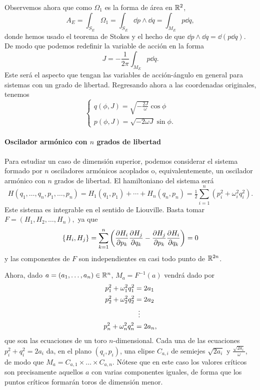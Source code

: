   Observemos ahora que como $\Omega_1$ es la forma de área en $\mathbb{R}^2$, 
  \begin{equation*}
    A_E=\int_{S_E}\Omega_1 = \int_{S_E} \dd p \wedge \dd q = \int_{M_E}p\dd q,
\end{equation*}
donde hemos usado el teorema de Stokes y el hecho de que $\dd p \wedge \dd q= \dd(p\dd q)$. De modo que podemos redefinir la variable de acción en la forma
\begin{equation*}
  J=-\frac{1}{2\pi}\int_{M_E}p \dd q.
\end{equation*}
Este será el aspecto que tengan las variables de acción-ángulo en general para sistemas con un grado de libertad. Regresando ahora a las coordenadas originales, tenemos
\begin{equation*}
  \begin{cases}
    q(\phi,J)=\sqrt{-\frac{2J}{ \omega}}\cos \phi\\
    p(\phi,J)=\sqrt{-2\omega J}\sin \phi.
  \end{cases}
\end{equation*}

\paragraph{\bf Oscilador armónico con $n$ grados de libertad}\mbox{}

  Para estudiar un caso de dimensión superior, podemos considerar el sistema formado por $n$ osciladores armónicos acoplados o, equivalentemente, un oscilador armónico con $n$ grados de libertad. El hamiltoniano del sistema será 
  \begin{equation*}
    H(q_1,\dots,q_n,p_1,\dots,p_n)= H_1(q_1,p_1)+ \cdots +H_n(q_n,p_n) = \tfrac{1}{2}\sum_{i=1}^n (p_i^2+\omega_i^2q_i^2).
  \end{equation*}
  Este sistema es integrable en el sentido de Liouville. Basta tomar $F=(H_1,H_2,\dots,H_n),$ ya que 
  \begin{equation*}
    \left\lbrace H_i,H_j\right\rbrace = \sum_{k=1}^n\left( \frac{\partial H_i}{\partial p_k}\frac{\partial H_j}{\partial q_k} - \frac{\partial H_j}{\partial p_k}\frac{\partial H_i}{\partial q_k}\right)=0
  \end{equation*}
  y las componentes de $F$ son independientes en casi todo punto de $\mathbb{R}^{2n}$. 
  
  Ahora, dado $a=(a_1,\dots,a_n)\in \mathbb{R}^n$, $M_a=F^{-1}(a)$ vendrá dado por 
  \begin{align*}[left=\empheqlbrace]
      p_1^2+\omega_1^2q_1^2&=2a_1 \\
      p_2^2+\omega_2^2q_2^2&=2a_2 \\
      & \vdotswithin{=} \\
p_n^2+\omega_n^2q_n^2&=2a_n, 
  \end{align*}
  que son las ecuaciones de un toro $n$-dimensional. Cada una de las ecuaciones $p_i^2+q_i^2=2a_i$ da, en el plano $(q_i,p_i)$, una elipse $C_{a,i}$ de semiejes $\sqrt{2a_i}$ y $\frac{\sqrt{2a_i}}{\omega}$, de modo que $M_a=C_{a,1}\times\dots\times C_{a,n}$. Nótese que en este caso los valores críticos son precisamente aquellos $a$ con varias componentes iguales, de forma que los puntos críticos formarán toros de dimensión menor.

